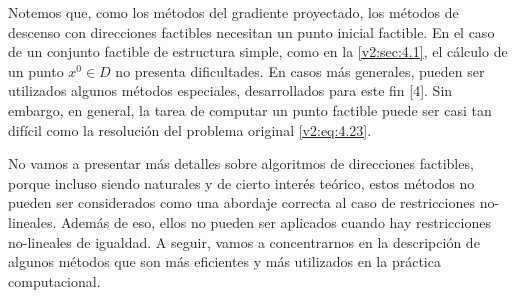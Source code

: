 Notemos que, como los métodos del gradiente proyectado, los métodos de descenso con direcciones factibles necesitan un punto inicial factible. En el caso de un conjunto factible de estructura simple, como en la \cref{v2:sec:4.1}, el cálculo de un punto $x^0 \in D$ no presenta dificultades. En casos más generales, pueden ser utilizados algunos métodos especiales, desarrollados para este fin [4]. Sin embargo, en general, la tarea de computar un punto factible puede ser casi tan difícil como la resolución del problema original \eqref{v2:eq:4.23}.

No vamos a presentar más detalles sobre algoritmos de direcciones factibles, porque incluso siendo naturales y de cierto interés teórico, estos métodos no pueden ser considerados como una abordaje correcta al caso de restricciones no-lineales. Además de eso, ellos no pueden ser aplicados cuando hay restricciones no-lineales de igualdad. A seguir, vamos a concentrarnos en la descripción de algunos métodos que son más eficientes y más utilizados en la práctica computacional.